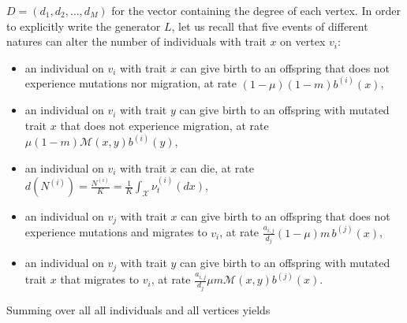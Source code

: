     $D = (d_1,d_2,\dots,d_M)$ for the vector containing the degree of each vertex.
    In order to explicitly write the generator $L$,
    let us recall that five events of different natures can alter the number of individuals with trait $x$ on vertex $v_i$:
    \begin{itemize}
        \item an individual on $v_i$ with trait $x$ can give birth to an offspring that does not experience mutations nor migration, at rate $(1 - \mu ) (1 - m) b^{(i)}(x)$,
        \item an individual on $v_i$ with trait $y$ can give birth to an offspring with mutated trait $x$ that does not experience migration, at rate $\mu (1-m) \mathcal{M}(x,y) b^{(i)}(y)$,
        \item an individual on $v_i$ with trait $x$ can die, at rate $d(N^{(i)}) = \frac{N^{(i)}}{K} = \frac{1}{K} \int_\mathcal{X} \nu_t^{(i)} (dx)$,
        \item an individual on $v_j$ with trait $x$ can give birth to an offspring that does not experience mutations and migrates to $v_i$, at rate $ \frac{a_{i,j}}{d_j} (1 - \mu ) m \, b^{(j)}(x)$,
        \item an individual on $v_j$ with trait $y$ can give birth to an offspring with mutated trait $x$ that migrates to $v_i$, at rate $ \frac{a_{i,j}}{d_j} \mu  m \mathcal{M}(x,y) b^{(j)}(x)$.
    \end{itemize}
    Summing over all all individuals and all vertices yields
    \small
